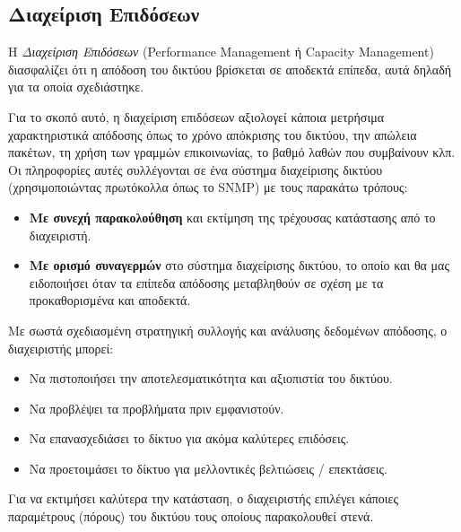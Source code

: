 %
%
\subsection{Διαχείριση Επιδόσεων}

\begin{inthebox}
Η \emph{Διαχείριση Επιδόσεων} (Performance Management ή Capacity Management) διασφαλίζει ότι η απόδοση του δικτύου βρίσκεται σε αποδεκτά επίπεδα, αυτά δηλαδή για τα οποία σχεδιάστηκε.\\
\end{inthebox}

Για το σκοπό αυτό, η διαχείριση επιδόσεων αξιολογεί κάποια μετρήσιμα χαρακτηριστικά απόδοσης όπως το χρόνο απόκρισης του δικτύου, την απώλεια πακέτων, τη χρήση των γραμμών επικοινωνίας, το βαθμό λαθών που συμβαίνουν κλπ. Οι πληροφορίες αυτές συλλέγονται σε ένα σύστημα διαχείρισης δικτύου (χρησιμοποιώντας πρωτόκολλα όπως το SNMP) με τους παρακάτω τρόπους:

\begin{itemize}
\item \textbf{Με συνεχή παρακολούθηση} και εκτίμηση της τρέχουσας κατάστασης από το διαχειριστή.
\item \textbf{Με ορισμό συναγερμών} στο σύστημα διαχείρισης δικτύου, το οποίο και θα μας ειδοποιήσει όταν τα επίπεδα απόδοσης μεταβληθούν σε σχέση με τα προκαθορισμένα και αποδεκτά.
\end{itemize}

Με σωστά σχεδιασμένη στρατηγική συλλογής και ανάλυσης δεδομένων απόδοσης, ο διαχειριστής μπορεί:

\begin{itemize}
\item Να πιστοποιήσει την αποτελεσματικότητα και αξιοπιστία του δικτύου.
\item Να προβλέψει τα προβλήματα πριν εμφανιστούν.
\item Να επανασχεδιάσει το δίκτυο για ακόμα καλύτερες επιδόσεις.
\item Να προετοιμάσει το δίκτυο για μελλοντικές βελτιώσεις / επεκτάσεις.
\end{itemize}

Για να εκτιμήσει καλύτερα την κατάσταση, ο διαχειριστής επιλέγει κάποιες παραμέτρους (πόρους) του δικτύου τους οποίους παρακολουθεί στενά.
